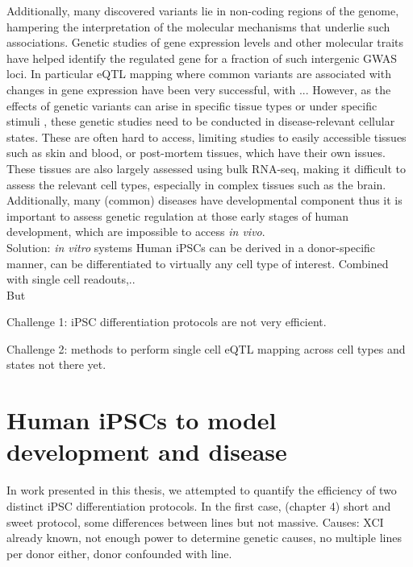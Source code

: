 Additionally, many discovered variants lie in non-coding regions of the genome, hampering the interpretation of the molecular mechanisms that underlie such associations. 
Genetic studies of gene expression levels and other molecular traits have helped identify the regulated gene for a fraction of such intergenic GWAS loci. 
In particular eQTL mapping where common variants are associated with changes in gene expression have been very successful, with ...
However, as the effects of genetic variants can arise in specific tissue types or under specific stimuli \cite{gtex2015genotype, barreiro2012deciphering}, these genetic studies need to be conducted in disease-relevant cellular states. 
These are often hard to access, limiting studies to easily accessible tissues such as skin and blood, or post-mortem tissues, which have their own issues.
These tissues are also largely assessed using bulk RNA-seq, making it difficult to assess the relevant cell types, especially in complex tissues such as the brain.\\

Additionally, many (common) diseases have developmental component thus it is important to assess genetic regulation at those early stages of human development, which are impossible to access \textit{in vivo}.\\

Solution: \textit{in vitro} systems
Human iPSCs can be derived in a donor-specific manner, can be differentiated to virtually any cell type of interest.
Combined with single cell readouts,..\\

But

Challenge 1: iPSC differentiation protocols are not very efficient.

Challenge 2: methods to perform single cell eQTL mapping across cell types and states not there yet.\\

\section{Human iPSCs to model development and disease}

In work presented in this thesis, we attempted to quantify the efficiency of two distinct iPSC differentiation protocols.
In the first case, (chapter 4) short and sweet protocol, some differences between lines but not massive.
Causes: XCI already known, not enough power to determine genetic causes, no multiple lines per donor either, donor confounded with line.\\

